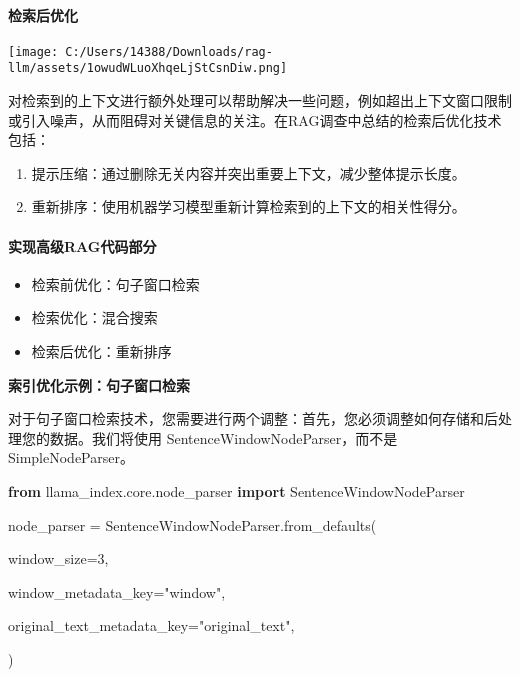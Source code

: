 \documentclass[
]{article}
\newenvironment{Shaded}{}{}
\newcommand{\DecValTok}[1]{\textcolor[rgb]{0.25,0.63,0.44}{#1}}
\newcommand{\ImportTok}[1]{\textcolor[rgb]{0.00,0.50,0.00}{\textbf{#1}}}
\newcommand{\NormalTok}[1]{#1}
\newcommand{\OperatorTok}[1]{\textcolor[rgb]{0.40,0.40,0.40}{#1}}
\newcommand{\StringTok}[1]{\textcolor[rgb]{0.25,0.44,0.63}{#1}}
\begin{document}
\paragraph{检索后优化}\label{ux68c0ux7d22ux540eux4f18ux5316}

\texttt{[image: C:/Users/14388/Downloads/rag-llm/assets/1owudWLuoXhqeLjStCsnDiw.png]}

对检索到的上下文进行额外处理可以帮助解决一些问题，例如超出上下文窗口限制或引入噪声，从而阻碍对关键信息的关注。在RAG调查中总结的检索后优化技术包括：

\begin{enumerate}
\def\labelenumi{\arabic{enumi}.}
\item
  提示压缩：通过删除无关内容并突出重要上下文，减少整体提示长度。
\item
  重新排序：使用机器学习模型重新计算检索到的上下文的相关性得分。
\end{enumerate}

\paragraph{实现高级RAG代码部分}\label{ux5b9eux73b0ux9ad8ux7ea7ragux4ee3ux7801ux90e8ux5206}

\begin{itemize}
\item
  检索前优化：句子窗口检索
\item
  检索优化：混合搜索
\item
  检索后优化：重新排序
\end{itemize}

\textbf{索引优化示例：句子窗口检索}

对于句子窗口检索技术，您需要进行两个调整：首先，您必须调整如何存储和后处理您的数据。我们将使用
SentenceWindowNodeParser，而不是 SimpleNodeParser。

\begin{Shaded}
\begin{Highlighting}[]
\ImportTok{from}\NormalTok{ llama\_index.core.node\_parser }\ImportTok{import}\NormalTok{ SentenceWindowNodeParser
}


\NormalTok{node\_parser }\OperatorTok{=}\NormalTok{ SentenceWindowNodeParser.from\_defaults(
}
\NormalTok{    window\_size}\OperatorTok{=}\DecValTok{3}\NormalTok{,
}
\NormalTok{    window\_metadata\_key}\OperatorTok{=}\StringTok{"window"}\NormalTok{,
}
\NormalTok{    original\_text\_metadata\_key}\OperatorTok{=}\StringTok{"original\_text"}\NormalTok{,
}
\NormalTok{)}
\end{Highlighting}
\end{Shaded}
\end{document}
